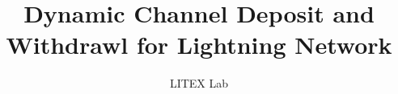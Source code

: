 \documentclass[10pt]{article}
\begin{document}
\title{\huge Dynamic Channel Deposit and Withdrawl for Lightning Network}
\date{}
\author{LITEX Lab}
\maketitle


%









%



\end{document}
